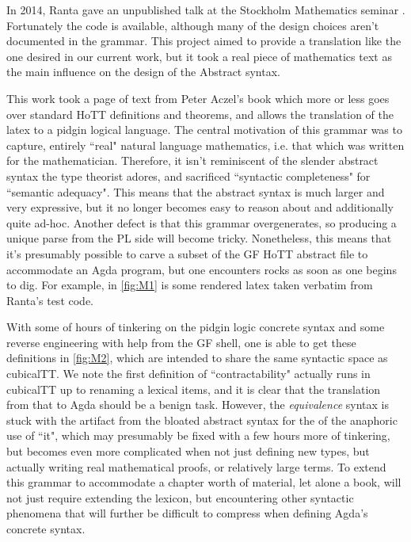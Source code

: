 In 2014, Ranta gave an unpublished talk at the Stockholm Mathematics seminar
\cite{aarneHott}. Fortunately the code is available, although many of the design
choices aren't documented in the grammar. This project aimed to provide a
translation like the one desired in our current work, but it took a real piece
of mathematics text as the main influence on the design of the Abstract syntax.

This work took a page of text from Peter Aczel's book which more or less goes
over standard HoTT definitions and theorems, and allows the translation of the
latex to a pidgin logical language. The central motivation of this grammar was
to capture, entirely ``real" natural language mathematics, i.e. that which was
written for the mathematician. Therefore, it isn't reminiscent of the slender
abstract syntax the type theorist adores, and sacrificed ``syntactic
completeness" for ``semantic adequacy". This means that the abstract syntax is
much larger and very expressive, but it no longer becomes easy to reason about
and additionally quite ad-hoc. Another defect is that this grammar
overgenerates, so producing a unique parse from the PL side will become tricky.
Nonetheless, this means that it's presumably possible to carve a subset of the
GF HoTT abstract file to accommodate an Agda program, but one encounters rocks as soon
as one begins to dig. For example, in \autoref{fig:M1} is some rendered latex
taken verbatim from Ranta's test code.

With some of hours of tinkering on the pidgin logic concrete syntax and some
reverse engineering with help from the GF shell, one is able to get these
definitions in \autoref{fig:M2}, which are intended to share the same syntactic
space as cubicalTT. We note the first definition of ``contractability" actually
runs in cubicalTT up to renaming a lexical items, and it is clear that the
translation from that to Agda should be a benign task. However, the
\emph{equivalence} syntax is stuck with the artifact from the bloated abstract
syntax for the of the anaphoric use of ``it", which may presumably be fixed with
a few hours more of tinkering, but becomes even more complicated when not just
defining new types, but actually writing real mathematical proofs, or relatively
large terms. To extend this grammar to accommodate a chapter worth of material,
let alone a book, will not just require extending the lexicon, but encountering
other syntactic phenomena that will further be difficult to compress when
defining Agda's concrete syntax.

